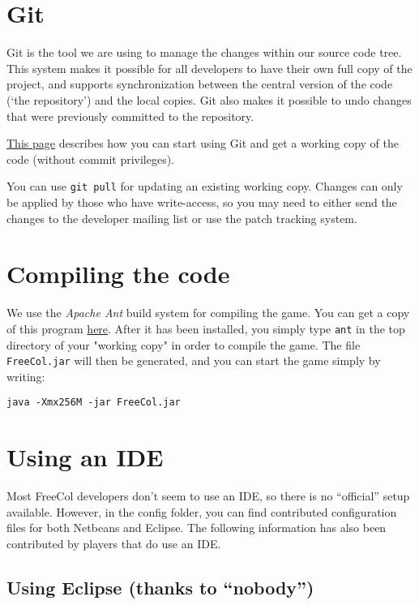 \documentclass[12pt]{book}
\begin{document}
\hypertarget{Git}{\section{Git}}

Git is the tool we are using to manage the changes within our source
code tree.  This system makes it possible for all developers to have
their own full copy of the project, and supports synchronization
between the central version of the code (`the repository') and the
local copies.  Git also makes it possible to undo changes that were
previously committed to the repository.

\href{http://www.freecol.org/documentation/git.html}{This page}
describes how you can start using Git and get a working copy of the
code (without commit privileges).

You can use \verb+git pull+ for updating an existing working
copy.  Changes can only be applied by those who have write-access, so
you may need to either send the changes to the developer mailing list
or use the patch tracking system.


\hypertarget{Compiling the code}{\section{Compiling the code}}

We use the \textit{Apache Ant} build system for compiling the
game. You can get a copy of this program
\href{http://ant.apache.org}{here}. After it has been installed, you
simply type \verb+ant+ in the top directory of your "working copy" in
order to compile the game.  The file \verb+FreeCol.jar+ will then be
generated, and you can start the game simply by writing:

\verb+java -Xmx256M -jar FreeCol.jar+


\hypertarget{Using an IDE}{\section{Using an IDE}}

Most FreeCol developers don't seem to use an IDE, so there is no
``official'' setup available. However, in the config folder, you can
find contributed configuration files for both Netbeans and Eclipse.
The following information has also been contributed by players that do
use an IDE.

\hypertarget{Using Eclipse}{\subsection{Using Eclipse (thanks to ``nobody'')}}
\end{document}
